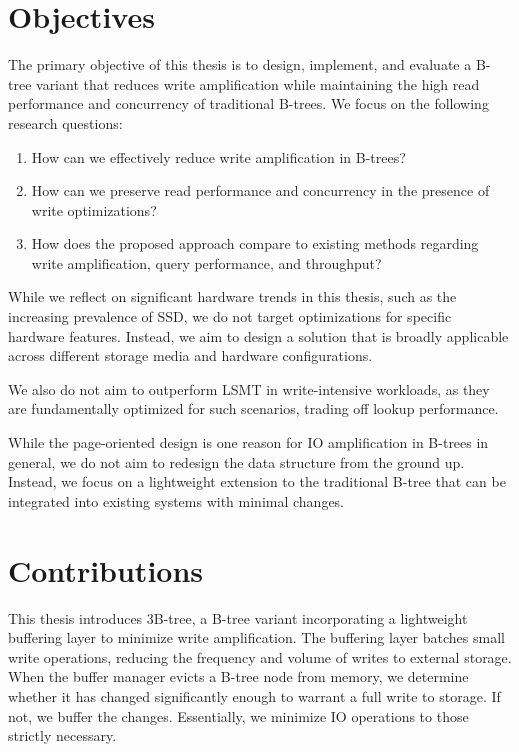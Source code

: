 \section{Objectives}
The primary objective of this thesis is to design, implement, and evaluate a B-tree variant that reduces write amplification while maintaining the high read performance and concurrency of traditional B-trees.
We focus on the following research questions:
\begin{enumerate}
  \item How can we effectively reduce write amplification in B-trees?
  \item How can we preserve read performance and concurrency in the presence of write optimizations?
  \item How does the proposed approach compare to existing methods regarding write amplification, query performance, and throughput?
  \end{enumerate}

While we reflect on significant hardware trends in this thesis, such as the increasing prevalence of \ac{SSD}, we do not target optimizations for specific hardware features.
Instead, we aim to design a solution that is broadly applicable across different storage media and hardware configurations.

We also do not aim to outperform \ac{LSMT} in write-intensive workloads, as they are fundamentally optimized for such scenarios, trading off lookup performance.

While the page-oriented design is one reason for \ac{IO} amplification in B-trees in general, we do not aim to redesign the data structure from the ground up.
Instead, we focus on a lightweight extension to the traditional B-tree that can be integrated into existing systems with minimal changes.

\section{Contributions}
This thesis introduces 3B-tree, a B-tree variant incorporating a lightweight buffering layer to minimize write amplification.
The buffering layer batches small write operations, reducing the frequency and volume of writes to external storage.
When the buffer manager evicts a B-tree node from memory, we determine whether it has changed significantly enough to warrant a full write to storage.
If not, we buffer the changes.
Essentially, we minimize \ac{IO} operations to those strictly necessary. 

